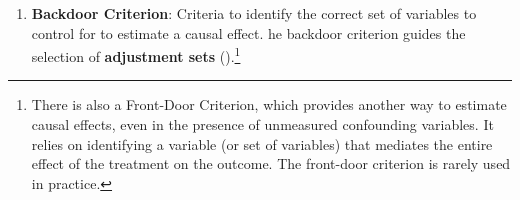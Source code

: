 \documentclass[
  singlecolumn,
  9pt]{article}
\providecommand{\tightlist}{%
  \setlength{\itemsep}{0pt}\setlength{\parskip}{0pt}}\usepackage{longtable,booktabs,array}
\begin{document}
\begin{enumerate}
\def\labelenumi{\arabic{enumi}.}
\setcounter{enumi}{11}
\tightlist
\item
  \textbf{Backdoor Criterion}: Criteria to identify the correct set of
  variables to control for to estimate a causal effect. he backdoor
  criterion guides the selection of \textbf{adjustment sets}
  ().\footnote{There is
    also a Front-Door Criterion, which provides another way to estimate
    causal effects, even in the presence of unmeasured confounding
    variables. It relies on identifying a variable (or set of variables)
    that mediates the entire effect of the treatment on the outcome. The
    front-door criterion is rarely used in practice.}
\end{enumerate}
\end{document}
